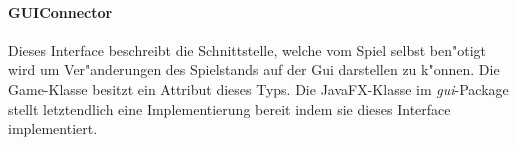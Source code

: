 \paragraph{GUIConnector}
\label{par:guiConnector}
Dieses Interface beschreibt die Schnittstelle, welche vom Spiel selbst ben"otigt wird um Ver"anderungen des Spielstands auf der Gui darstellen zu k"onnen. Die Game-Klasse besitzt ein Attribut dieses Typs. Die JavaFX-Klasse im \emph{gui}-Package stellt letztendlich eine Implementierung bereit indem sie dieses Interface implementiert. 